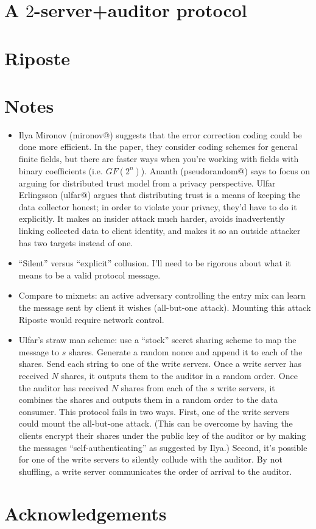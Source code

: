 \documentclass[letter]{article}
\begin{document}
\section{A $2$-server+auditor protocol}


\section{Riposte}

\fi

\section{Notes}
\begin{itemize}
  \item Ilya Mironov (mironov@) suggests that the error correction coding could
    be done more efficient. In the paper, they consider coding schemes for
    general finite fields, but there are faster ways when you're working with
    fields with binary coefficients (i.e. $GF(2^n)$). Ananth (pseudorandom@)
    says to focus on arguing for distributed trust model from a privacy
    perspective.  Ulfar Erlingsson (ulfar@) argues that distributing trust is a
    means of keeping the data collector honest; in order to violate your
    privacy, they'd have to do it explicitly. It makes an insider attack much
    harder, avoids inadvertently linking collected data to client identity, and
    makes it so an outside attacker has two targets instead of one.


  \item ``Silent'' versus ``explicit'' collusion. I'll need to be rigorous about
    what it means to be a valid protocol message.

  \item Compare to mixnets: an active adversary controlling the entry mix can
    learn the message sent by client it wishes (all-but-one attack). Mounting
    this attack Riposte would require network control.

  \item Ulfar's straw man scheme: use a ``stock'' secret sharing scheme to map
    the message to $s$ shares. Generate a random nonce and append it to each of
    the shares. Send each string to one of the write servers. Once a write
    server has received $N$ shares, it outputs them to the auditor in a random
    order.  Once the auditor has received $N$ shares from each of the $s$ write
    servers, it combines the shares and outputs them in a random order to the
    data consumer. This protocol fails in two ways. First, one of the write
    servers could mount the all-but-one attack. (This can be overcome by
    having the clients encrypt their shares under the public key of the auditor
    or by making the messages ``self-authenticating'' as suggested by Ilya.)
    Second, it's possible for one of the write servers to silently collude with
    the auditor. By not shuffling, a write server communicates the order of
    arrival to the auditor.
\end{itemize}

\section{Acknowledgements}




\end{document}
